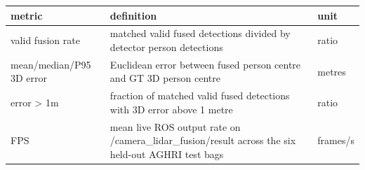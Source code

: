 \begin{tabular}{lll}
 \toprule
metric & definition & unit \\
 \midrule
valid fusion rate & matched valid fused detections divided by detector person detections & ratio \\
mean/median/P95 3D error & Euclidean error between fused person centre and GT 3D person centre & metres \\
error > 1m & fraction of matched valid fused detections with 3D error above 1 metre & ratio \\
FPS & mean live ROS output rate on /camera_lidar_fusion/result across the six held-out AGHRI test bags & frames/s \\
 \bottomrule
\end{tabular}
